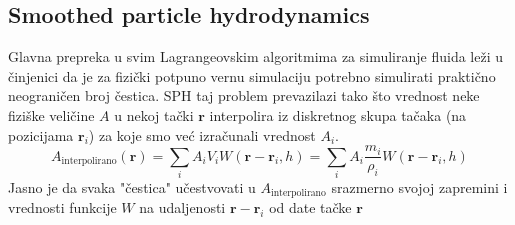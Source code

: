 \documentclass[12pt]{article}
\renewcommand{\vec}[1]{\boldsymbol{#1}}
\begin{document}
    \subsection{Smoothed particle hydrodynamics}
        Glavna prepreka u svim Lagrangeovskim algoritmima za simuliranje fluida le\v zi u \v cinjenici da je za fizi\v cki potpuno vernu simulaciju potrebno simulirati prakti\v cno neograni\v cen broj \v cestica. SPH taj problem prevazilazi tako \v sto vrednost neke fizi\v ske veli\v cine $A$ u nekoj ta\v cki $\vec{r}$ interpolira iz diskretnog skupa ta\v caka (na pozicijama $\vec{r}_i$) za koje smo ve\'c izra\v cunali vrednost $A_i$.
            $$A_\text{interpolirano}(\vec{r}) = \sum_i{A_i V_i W(\vec{r}-\vec{r}_i, h)} = \sum_i{A_i \frac{m_i}{\rho_i} W(\vec{r}-\vec{r}_i, h)}$$
        Jasno je da svaka "\v cestica" u\v cestvovati u $A_\text{interpolirano}$ srazmerno svojoj zapremini i vrednosti funkcije $W$ na udaljenosti $\vec{r}-\vec{r}_i$ od date ta\v cke $\vec{r}$
\newpage


\end{document}
